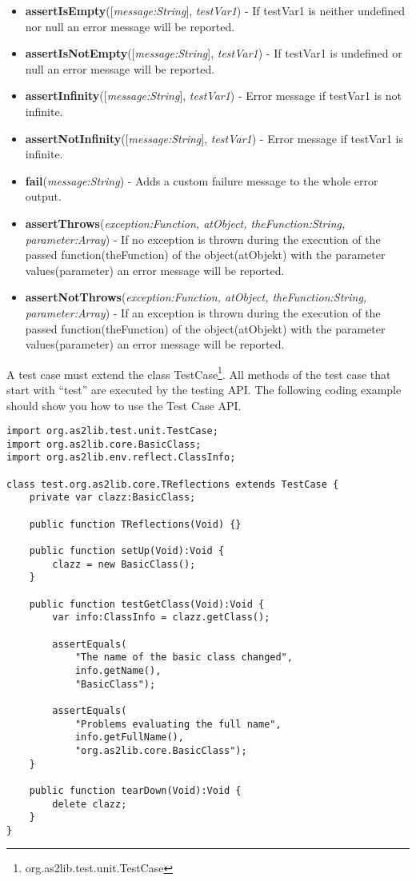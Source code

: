 \begin{itemize}
	\item \textbf{assertIsEmpty}([\textit{message:String}], \textit{testVar1}) - If testVar1 is neither undefined nor null an error message will be reported.
	\item \textbf{assertIsNotEmpty}([\textit{message:String}], \textit{testVar1}) - If testVar1 is undefined or null an error message will be reported.
	\item \textbf{assertInfinity}([\textit{message:String}], \textit{testVar1}) - Error message if testVar1 is not infinite.
	\item \textbf{assertNotInfinity}([\textit{message:String}], \textit{testVar1}) - Error message if testVar1 is infinite.
	\item \textbf{fail}(\textit{message:String}) - Adds a custom failure message to the whole error output.
	\item \textbf{assertThrows}(\textit{exception:Function, atObject, theFunction:String, parameter:Array}) - If no exception is thrown during the execution of the passed function(theFunction) of the object(atObjekt) with the parameter values(parameter) an error message will be reported.
	\item \textbf{assertNotThrows}(\textit{exception:Function, atObject, theFunction:String, parameter:Array}) - If an exception is thrown during the execution of the passed function(theFunction) of the object(atObjekt) with the parameter values(parameter) an error message will be reported.
\end{itemize}

A test case must extend the class TestCase\footnote{org.as2lib.test.unit.TestCase}. All methods of the test case that start with ``test'' are executed by the testing API. The following coding example should show you how to use the Test Case API.
\begin{lstlisting}[frame=single]
import org.as2lib.test.unit.TestCase;
import org.as2lib.core.BasicClass;
import org.as2lib.env.reflect.ClassInfo;

class test.org.as2lib.core.TReflections extends TestCase {
	private var clazz:BasicClass;
	
	public function TReflections(Void) {}
	
	public function setUp(Void):Void {
		clazz = new BasicClass();
	}
	
	public function testGetClass(Void):Void {
		var info:ClassInfo = clazz.getClass();
		
		assertEquals(
			"The name of the basic class changed",
			info.getName(),
			"BasicClass");
		
		assertEquals(
			"Problems evaluating the full name",
			info.getFullName(),
			"org.as2lib.core.BasicClass");
	}
	
	public function tearDown(Void):Void {
		delete clazz;
	}
}
\end{lstlisting}

